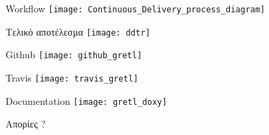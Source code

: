 \documentclass[xetex]{beamer}
\begin{document}
\begin{frame}{Workflow}
	\texttt{[image: Continuous\_Delivery\_process\_diagram]}
\end{frame}

\begin{frame}{Τελικό αποτέλεσμα}
	\texttt{[image: ddtr]}
\end{frame}

\begin{frame}{Github}
	\texttt{[image: github\_gretl]}
\end{frame}

\begin{frame}{Travis}
	\texttt{[image: travis\_gretl]}
\end{frame}

\begin{frame}{Documentation}
	\texttt{[image: gretl\_doxy]}
\end{frame}

\begin{frame}{Απορίες}
	\centering \Huge ?
\end{frame}
\end{document}

